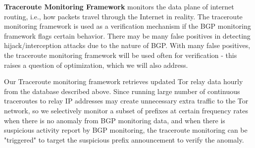 {\bf Traceroute Monitoring Framework} monitors the data plane of internet routing, i.e., how packets travel through the Internet in reality. The traceroute monitoring framework is used as a verification mechanism if the BGP monitoring framework flags certain behavior. There may be many false positives in detecting hijack/interception attacks due to the nature of BGP.  With many false positives, the traceroute monitoring framework will be used often for verification - this raises a question of optimization, which we will also address.

Our Traceroute monitoring framework retrieves updated Tor relay data hourly from the database described above. Since running large number of continuous traceroutes to relay IP addresses may create unnecessary extra traffic to the Tor network, so we selectively monitor a subset of prefixes at certain frequency rates when there is no anomaly from BGP monitoring data, and when there is suspicious activity report by BGP monitoring, the traceroute monitoring can be "triggered" to target the suspicious prefix announcement to verify the anomaly. 
